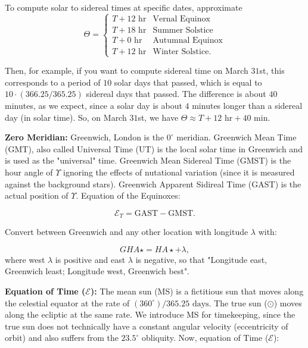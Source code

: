 \documentclass[11pt]{article}
\newcommand{\V}{

\vspace{\baselineskip}

}
\begin{document}
To compute solar to sidereal times at specific dates, approximate 
\[
\Theta = \begin{cases}
    T + 12\text{ hr} & \text{Vernal Equinox} \\
    T + 18\text{ hr} & \text{Summer Solstice} \\
    T + 0\text{ hr} & \text{Autumnal Equinox} \\
    T + 12\text{ hr} & \text{Winter Solstice}. 
\end{cases}
\]

Then, for example, if you want to compute sidereal time on March $31$st, this corresponds to a period of $10$ solar days that passed, which is equal to $10\cdot (366.25/365.25)$ sidereal days that passed. The difference is about $40$ minutes, as we expect, since a solar day is about $4$ minutes longer than a sidereal day (in solar time). So, on March $31$st, we have $\Theta \approx T + 12\text{ hr} + 40\text{ min}$.\V

\textbf{Zero Meridian:} Greenwich, London is the $0^{\circ}$ meridian. Greenwich Mean Time (GMT), also called Universal Time (UT) is the local solar time in Greenwich and is used as the "universal" time. Greenwich Mean Sidereal Time (GMST) is the hour angle of $\Upsilon$ ignoring the effects of nutational variation (since it is measured against the background stars). Greenwich Apparent Sidireal Time (GAST) is the actual position of $\Upsilon$. Equation of the Equinoxes: 

\begin{equation*}
    \mathcal{E}_{\Upsilon} = \text{GAST} - \text{GMST}.
\end{equation*}

Convert between Greenwich and any other location with longitude $\lambda$ with: 

\begin{equation*}
    GHA\star = HA\star + \lambda,
\end{equation*}
where west $\lambda$ is positive and east $\lambda$ is negative, so that "Longitude east, Greenwich least; Longitude west, Greenwich best".\V

\textbf{Equation of Time ($\mathcal{E}$):} The mean sun (MS) is a fictitious sun that moves along the celestial equator at the rate of $(360^{\circ})/365.25\text{ days}$. The true sun ($\odot$) moves along the ecliptic at the same rate. We introduce MS for timekeeping, since the true sun does not technically have a constant angular velocity (eccentricity of orbit) and also suffers from the $23.5^{\circ}$ obliquity. Now, equation of Time ($\mathcal{E}$):
\end{document}
